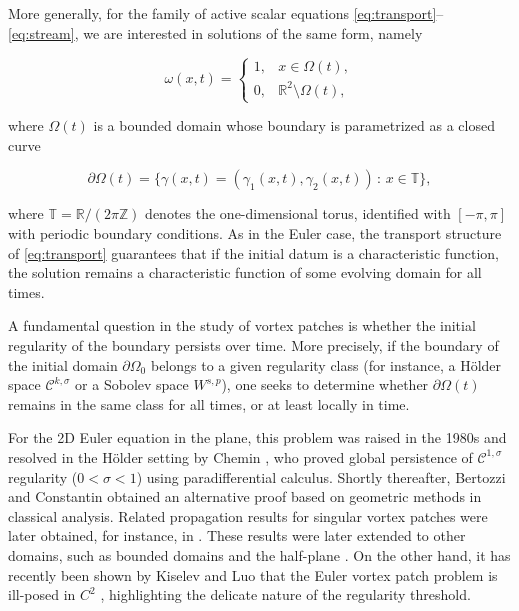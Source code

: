 \documentclass[a4paper]{amsart}
\theoremstyle{definition}
\newcommand{\T}{\ensuremath{\mathbb{T}}}
\newcommand{\Lipa}[1][\gamma]{\ensuremath{\mathcal{C}^#1}}
\newcommand{\LipUa}[1][\gamma]{\ensuremath{\Lipa[{{1,#1}}]}}
\begin{document}
More generally, for the family of active scalar equations \eqref{eq:transport}–\eqref{eq:stream}, we are interested in solutions of the same form, namely

\begin{equation}\label{eq:charDomini}
\omega(x,t)=\left\{\begin{array}{ll}
     1, & x\in\Omega(t), \\
     0, & \mathbb{R}^2\setminus\Omega(t),
\end{array}\right.
\end{equation}

where \(\Omega(t)\) is a bounded domain whose boundary is parametrized as a closed curve

\[
\partial\Omega(t)=\{\gamma(x,t)=(\gamma_1(x,t),\gamma_2(x,t))\,:\, x\in\T\},
\]

where \(\T=\mathbb{R}/(2\pi\mathbb{Z})\) denotes the one-dimensional torus, identified with \([-\pi,\pi]\) with periodic boundary conditions. As in the Euler case, the transport structure of \eqref{eq:transport} guarantees that if the initial datum is a characteristic function, the solution remains a characteristic function of some evolving domain for all times.

A fundamental question in the study of vortex patches is whether the initial regularity of the boundary persists over time. More precisely, if the boundary of the initial domain \(\partial\Omega_0\) belongs to a given regularity class (for instance, a Hölder space \(\mathcal{C}^{k,\sigma}\) or a Sobolev space \(W^{s,p}\)), one seeks to determine whether \(\partial\Omega(t)\) remains in the same class for all times, or at least locally in time.

For the 2D Euler equation in the plane, this problem was raised in the 1980s and resolved in the Hölder setting by Chemin \cite{chemin1993persistance}, who proved global persistence of \(\LipUa[\sigma]\) regularity (\(0<\sigma<1\)) using paradifferential calculus. Shortly thereafter, Bertozzi and Constantin \cite{bertozzi1993global} obtained an alternative proof based on geometric methods in classical analysis. Related propagation results for singular vortex patches were later obtained, for instance, in \cite{danchin1997singular}. These results were later extended to other domains, such as bounded domains and the half-plane \cite{depauw1999poche, kiselev2019global}. On the other hand, it has recently been shown by Kiselev and Luo that the Euler vortex patch problem is ill-posed in \(C^2\) \cite{kiselevLuo2022}, highlighting the delicate nature of the regularity threshold.
\end{document}

